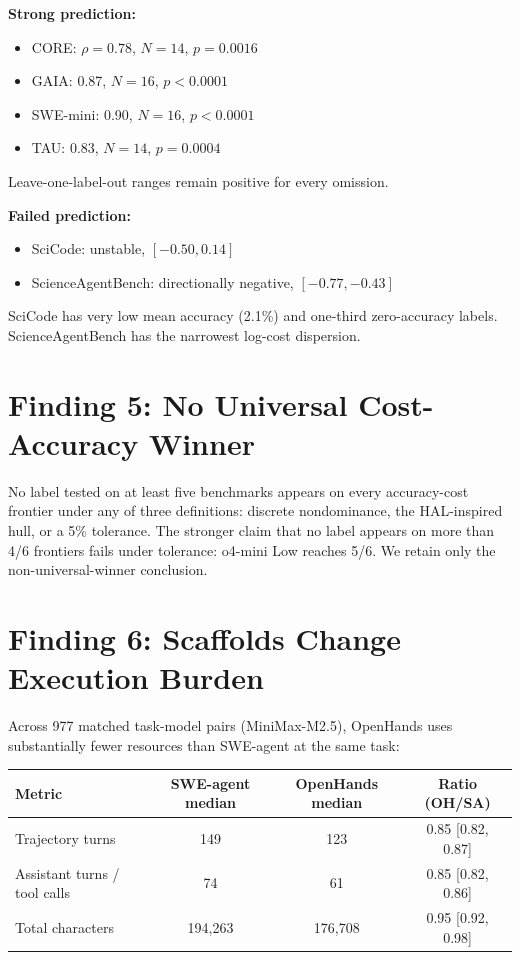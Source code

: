 \documentclass[11pt]{article}
\begin{document}
\textbf{Strong prediction:}
\begin{itemize}[nosep]
\item CORE: $\rho = 0.78$, $N = 14$, $p = 0.0016$
\item GAIA: 0.87, $N = 16$, $p < 0.0001$
\item SWE-mini: 0.90, $N = 16$, $p < 0.0001$
\item TAU: 0.83, $N = 14$, $p = 0.0004$
\end{itemize}

Leave-one-label-out ranges remain positive for every omission.

\textbf{Failed prediction:}
\begin{itemize}[nosep]
\item SciCode: unstable, $[-0.50, 0.14]$
\item ScienceAgentBench: directionally negative, $[-0.77, -0.43]$
\end{itemize}

SciCode has very low mean accuracy (2.1\%) and one-third zero-accuracy labels.
ScienceAgentBench has the narrowest log-cost dispersion.

\section{Finding 5: No Universal Cost-Accuracy Winner}

No label tested on at least five benchmarks appears on every accuracy-cost
frontier under any of three definitions: discrete nondominance, the HAL-inspired
hull, or a 5\% tolerance. The stronger claim that no label appears on more than
4/6 frontiers fails under tolerance: o4-mini Low reaches 5/6. We retain only
the non-universal-winner conclusion.

\section{Finding 6: Scaffolds Change Execution Burden}

Across 977 matched task-model pairs (MiniMax-M2.5), OpenHands uses
substantially fewer resources than SWE-agent at the same task:

\begin{center}
\begin{tabular}{lccc}
\toprule
Metric & SWE-agent median & OpenHands median & Ratio (OH/SA) \\
\midrule
Trajectory turns & 149 & 123 & 0.85 [0.82, 0.87] \\
Assistant turns / tool calls & 74 & 61 & 0.85 [0.82, 0.86] \\
Total characters & 194{,}263 & 176{,}708 & 0.95 [0.92, 0.98] \\
\bottomrule
\end{tabular}
\end{center}
\end{document}
